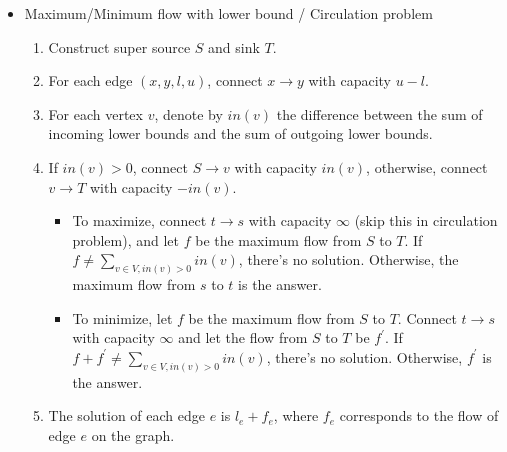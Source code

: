 \begin{itemize}
    \itemsep-0.3em
    \item Maximum/Minimum flow with lower bound / Circulation problem
    \vspace{-1em}
    \begin{enumerate}
        \itemsep-0.3em
        \item Construct super source $S$ and sink $T$.
        \item For each edge $(x, y, l, u)$, connect $x \rightarrow y$ with capacity $u - l$.
        \item For each vertex $v$, denote by $in(v)$ the difference between the sum of incoming lower bounds and the sum of outgoing lower bounds.
        \item If $in(v) > 0$, connect $S \rightarrow v$ with capacity $in(v)$, otherwise, connect $v \rightarrow T$ with capacity $-in(v)$.
        \begin{itemize}
            \itemsep-0.2em
            \item To maximize, connect $t \rightarrow s$ with capacity $\infty$ (skip this in circulation problem), and let $f$ be the maximum flow from $S$ to $T$. If $f \neq \sum_{v \in V, in(v) > 0}{in(v)}$, there's no solution. Otherwise, the maximum flow from $s$ to $t$ is the answer.
            \item To minimize, let $f$ be the maximum flow from $S$ to $T$. Connect $t \rightarrow s$ with capacity $\infty$ and let the flow from $S$ to $T$ be $f^\prime$. If $f + f^\prime \neq \sum_{v \in V, in(v) > 0}{in(v)}$, there's no solution. Otherwise, $f^\prime$ is the answer.
        \end{itemize}
        \item The solution of each edge $e$ is $l_e + f_e$, where $f_e$ corresponds to the flow of edge $e$ on the graph.
    \end{enumerate}

\end{itemize}
